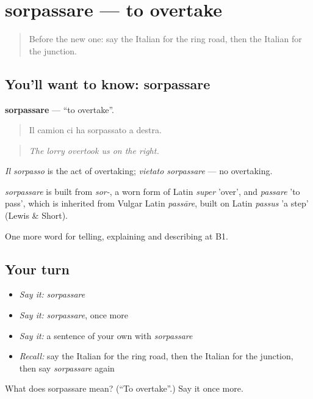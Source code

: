 \section[sorpassare]{sorpassare — to overtake}

\label{lesson:IT-C405-sorpassare}



\begin{quote}
Before the new one: say the Italian for the ring road, then the Italian for the junction.
\end{quote}

\subsection*{You'll want to know: sorpassare}
\textbf{sorpassare} — \textquotedblleft{}to overtake\textquotedblright{}.

\begin{quote}
Il camion ci ha sorpassato a destra.
\end{quote}

\begin{quote}
\emph{The lorry overtook us on the right.}
\end{quote}

\emph{Il sorpasso} is the act of overtaking; \emph{vietato sorpassare} — no overtaking.

\begin{cousinweb}
\emph{sorpassare} is built from \emph{sor-}, a worn form of Latin \emph{super} 'over', and \emph{passare} 'to pass', which is inherited from Vulgar Latin \emph{passāre}, built on Latin \emph{passus} 'a step' (Lewis \& Short).
\end{cousinweb}

\begin{grammarlens}[title={What you've built}]
One more word for telling, explaining and describing at B1.
\end{grammarlens}

\subsection*{Your turn}
\begin{itemize}
\raggedright
  \item \emph{Say it:} \emph{sorpassare}
  \item \emph{Say it:} \emph{sorpassare}, once more
  \item \emph{Say it:} a sentence of your own with \emph{sorpassare}
  \item \emph{Recall:} say the Italian for the ring road, then the Italian for the junction, then say \emph{sorpassare} again
\end{itemize}

\begin{tcolorbox}[breakable,colback=teal!4,colframe=teal!35!black,title={Before you move on}]
What does sorpassare mean? (\textquotedblleft{}To overtake\textquotedblright{}.) Say it once more.
\end{tcolorbox}
